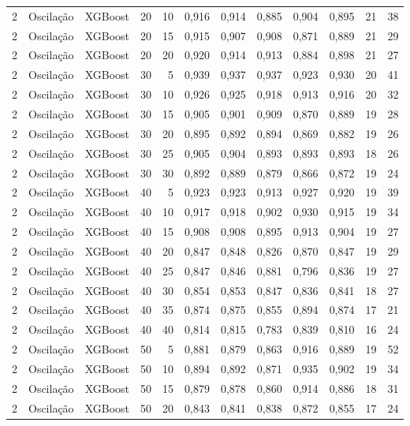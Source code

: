 \begin{longtable}{ccclrrrrrrrr}
2 & Oscilação & XGBoost & 20 & 10 & 0,916 & 0,914 & 0,885 & 0,904 & 0,895 & 21 & 38 \\
2 & Oscilação & XGBoost & 20 & 15 & 0,915 & 0,907 & 0,908 & 0,871 & 0,889 & 21 & 29 \\
2 & Oscilação & XGBoost & 20 & 20 & 0,920 & 0,914 & 0,913 & 0,884 & 0,898 & 21 & 27 \\
2 & Oscilação & XGBoost & 30 & 5 & 0,939 & 0,937 & 0,937 & 0,923 & 0,930 & 20 & 41 \\
2 & Oscilação & XGBoost & 30 & 10 & 0,926 & 0,925 & 0,918 & 0,913 & 0,916 & 20 & 32 \\
2 & Oscilação & XGBoost & 30 & 15 & 0,905 & 0,901 & 0,909 & 0,870 & 0,889 & 19 & 28 \\
2 & Oscilação & XGBoost & 30 & 20 & 0,895 & 0,892 & 0,894 & 0,869 & 0,882 & 19 & 26 \\
2 & Oscilação & XGBoost & 30 & 25 & 0,905 & 0,904 & 0,893 & 0,893 & 0,893 & 18 & 26 \\
2 & Oscilação & XGBoost & 30 & 30 & 0,892 & 0,889 & 0,879 & 0,866 & 0,872 & 19 & 24 \\
2 & Oscilação & XGBoost & 40 & 5 & 0,923 & 0,923 & 0,913 & 0,927 & 0,920 & 19 & 39 \\
2 & Oscilação & XGBoost & 40 & 10 & 0,917 & 0,918 & 0,902 & 0,930 & 0,915 & 19 & 34 \\
2 & Oscilação & XGBoost & 40 & 15 & 0,908 & 0,908 & 0,895 & 0,913 & 0,904 & 19 & 27 \\
2 & Oscilação & XGBoost & 40 & 20 & 0,847 & 0,848 & 0,826 & 0,870 & 0,847 & 19 & 29 \\
2 & Oscilação & XGBoost & 40 & 25 & 0,847 & 0,846 & 0,881 & 0,796 & 0,836 & 19 & 27 \\
2 & Oscilação & XGBoost & 40 & 30 & 0,854 & 0,853 & 0,847 & 0,836 & 0,841 & 18 & 27 \\
2 & Oscilação & XGBoost & 40 & 35 & 0,874 & 0,875 & 0,855 & 0,894 & 0,874 & 17 & 21 \\
2 & Oscilação & XGBoost & 40 & 40 & 0,814 & 0,815 & 0,783 & 0,839 & 0,810 & 16 & 24 \\
2 & Oscilação & XGBoost & 50 & 5 & 0,881 & 0,879 & 0,863 & 0,916 & 0,889 & 19 & 52 \\
2 & Oscilação & XGBoost & 50 & 10 & 0,894 & 0,892 & 0,871 & 0,935 & 0,902 & 19 & 34 \\
2 & Oscilação & XGBoost & 50 & 15 & 0,879 & 0,878 & 0,860 & 0,914 & 0,886 & 18 & 31 \\
2 & Oscilação & XGBoost & 50 & 20 & 0,843 & 0,841 & 0,838 & 0,872 & 0,855 & 17 & 24 \\

\end{longtable}
